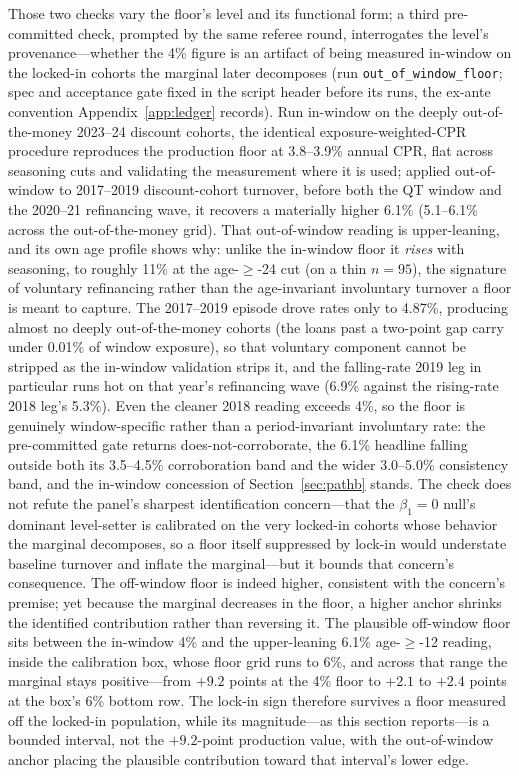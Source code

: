 \documentclass[12pt]{article}
\begin{document}
Those two checks vary the floor's level and its functional form; a third pre-committed check, prompted by the same referee round, interrogates the level's provenance---whether the 4\% figure is an artifact of being measured in-window on the locked-in cohorts the marginal later decomposes (run \texttt{out\_of\_window\_floor}; spec and acceptance gate fixed in the script header before its runs, the ex-ante convention Appendix~\ref{app:ledger} records). Run in-window on the deeply out-of-the-money 2023--24 discount cohorts, the identical exposure-weighted-CPR procedure reproduces the production floor at 3.8--3.9\% annual CPR, flat across seasoning cuts and validating the measurement where it is used; applied out-of-window to 2017--2019 discount-cohort turnover, before both the QT window and the 2020--21 refinancing wave, it recovers a materially higher 6.1\% (5.1--6.1\% across the out-of-the-money grid). That out-of-window reading is upper-leaning, and its own age profile shows why: unlike the in-window floor it \emph{rises} with seasoning, to roughly 11\% at the age-$\geq$-24 cut (on a thin $n = 95$), the signature of voluntary refinancing rather than the age-invariant involuntary turnover a floor is meant to capture. The 2017--2019 episode drove rates only to 4.87\%, producing almost no deeply out-of-the-money cohorts (the loans past a two-point gap carry under 0.01\% of window exposure), so that voluntary component cannot be stripped as the in-window validation strips it, and the falling-rate 2019 leg in particular runs hot on that year's refinancing wave (6.9\% against the rising-rate 2018 leg's 5.3\%). Even the cleaner 2018 reading exceeds 4\%, so the floor is genuinely window-specific rather than a period-invariant involuntary rate: the pre-committed gate returns does-not-corroborate, the 6.1\% headline falling outside both its 3.5--4.5\% corroboration band and the wider 3.0--5.0\% consistency band, and the in-window concession of Section~\ref{sec:pathb} stands. The check does not refute the panel's sharpest identification concern---that the $\beta_1 = 0$ null's dominant level-setter is calibrated on the very locked-in cohorts whose behavior the marginal decomposes, so a floor itself suppressed by lock-in would understate baseline turnover and inflate the marginal---but it bounds that concern's consequence. The off-window floor is indeed higher, consistent with the concern's premise; yet because the marginal decreases in the floor, a higher anchor shrinks the identified contribution rather than reversing it. The plausible off-window floor sits between the in-window 4\% and the upper-leaning 6.1\% age-$\geq$-12 reading, inside the calibration box, whose floor grid runs to 6\%, and across that range the marginal stays positive---from $+9.2$ points at the 4\% floor to $+2.1$ to $+2.4$ points at the box's 6\% bottom row. The lock-in sign therefore survives a floor measured off the locked-in population, while its magnitude---as this section reports---is a bounded interval, not the $+9.2$-point production value, with the out-of-window anchor placing the plausible contribution toward that interval's lower edge.
\end{document}
